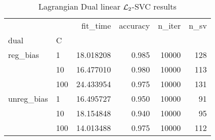 \begin{table}[H]
\centering
\caption{Lagrangian Dual linear $\protect \mathcal{L}_2$-SVC results}
\label{linear_lagrangian_dual_l2_svc_cv_results}
\begin{tabular}{llrrrr}
\toprule
           &     &   fit\_time &  accuracy &  n\_iter &  n\_sv \\
dual & C &            &           &         &       \\
\midrule
reg\_bias & 1   &  18.018208 &     0.985 &   10000 &   128 \\
           & 10  &  16.477010 &     0.980 &   10000 &   113 \\
           & 100 &  24.433954 &     0.975 &   10000 &   131 \\
unreg\_bias & 1   &  16.495727 &     0.950 &   10000 &    91 \\
           & 10  &  18.154848 &     0.940 &   10000 &    95 \\
           & 100 &  14.013488 &     0.975 &   10000 &   112 \\
\bottomrule
\end{tabular}
\end{table}
